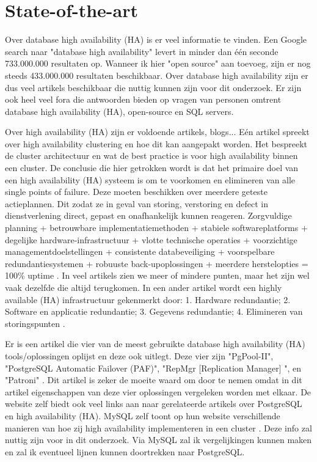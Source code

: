 
\section{State-of-the-art}
\label{sec:state-of-the-art}
Over database high availability (HA) is er veel informatie te vinden. Een Google search naar "database high availability" levert in minder dan één seconde 733.000.000 resultaten op. Wanneer ik hier "open source" aan toevoeg, zijn er nog steeds 433.000.000 resultaten beschikbaar. Over database high availability zijn er dus veel artikels beschikbaar die nuttig kunnen zijn voor dit onderzoek. Er zijn ook heel veel fora die antwoorden bieden op vragen van personen omtrent database high availability (HA), open-source en SQL servers.


Over high availability (HA) zijn er voldoende artikels, blogs... Eén artikel spreekt over high availability clustering en hoe dit kan aangepakt worden. Het bespreekt de cluster architectuur en wat de best practice is voor high availability binnen een cluster. De conclusie die hier getrokken wordt is dat het primaire doel van een high availability (HA) systeem is om te voorkomen en elimineren van alle single points of failure. Deze moeten beschikken over meerdere geteste actieplannen. Dit zodat ze in geval van storing, verstoring en defect in dienstverlening direct, gepast en onafhankelijk kunnen reageren. 
Zorgvuldige planning + betrouwbare implementatiemethoden + stabiele softwareplatforms + degelijke hardware-infrastructuur + vlotte technische operaties + voorzichtige managementdoelstellingen + consistente databeveiliging + voorspelbare redundantiesystemen + robuuste back-upoplossingen + meerdere herstelopties = 100\% uptime \autocite{Singer2020}.
In veel artikels zien we meer of mindere punten, maar het zijn wel vaak dezelfde die altijd terugkomen. In een ander artikel wordt een highly available (HA) infrastructuur gekenmerkt door: 1. Hardware redundantie; 2. Software en applicatie redundantie; 3. Gegevens redundantie; 4. Elimineren van storingspunten \autocite{Jevtic2018}.


Er is een artikel die vier van de meest gebruikte database high availability (HA) tools/oplossingen oplijst en deze ook uitlegt. Deze vier zijn "PgPool-II", "PostgreSQL Automatic Failover (PAF)", "RepMgr [Replication Manager] ", en "Patroni" \autocite{Akhtar2020}. Dit artikel is zeker de moeite waard om door te nemen omdat in dit artikel eigenschappen van deze vier oplossingen vergeleken worden met elkaar. De website zelf biedt ook veel links aan naar gerelateerde artikels over PostgreSQL en high availability (HA). 
MySQL zelf toont op hun website verschillende manieren van hoe zij high availability implementeren in een cluster \autocite{MySQL2021}. Deze info zal nuttig zijn voor in dit onderzoek. Via MySQL zal ik vergelijkingen kunnen maken en zal ik eventueel lijnen kunnen doortrekken naar PostgreSQL.



